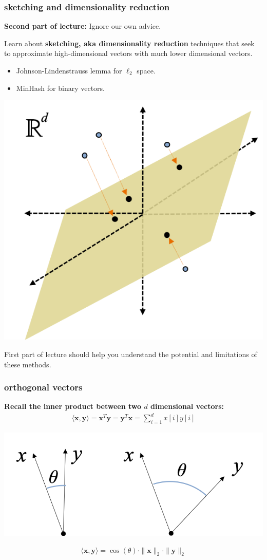 \documentclass[compress]{beamer}
\newcommand{\bv}[1]{\mathbf{#1}}
\begin{document}
\begin{frame}
	\frametitle{sketching and dimensionality reduction}
	\begin{center}
		\textbf{Second part of lecture:} Ignore our own advice. 
	\end{center}
		Learn about \alert{\textbf{sketching, aka dimensionality reduction}} techniques that seek to approximate high-dimensional vectors with much lower dimensional vectors. 
		\begin{itemize}
			\item Johnson-Lindenstrauss lemma for $\ell_2$ space.
			\item MinHash for binary vectors. 
		\end{itemize}
		\begin{center}
			\vspace{-.75em}
		\includegraphics[width=.3\textwidth]{random_projection.png}
		\vspace{-.75em}
		\end{center}
		
		First part of lecture should help you understand the potential and limitations of these methods. 
\end{frame}

\begin{frame}[t]
	\frametitle{orthogonal vectors}
		\textbf{Recall the inner product between two $d$ dimensional vectors:}
		\begin{align*}
			\langle \bv{x},\bv{y} \rangle = \bv{x}^T\bv{y} = \bv{y}^T\bv{x} = \sum_{i=1}^d x[i]y[i]
		\end{align*}
	\begin{center}
		\includegraphics[width=.7\textwidth]{inner_product.png}
	\end{center}
	
	\begin{align*}
		\langle \bv{x},\bv{y} \rangle = \cos(\theta)\cdot\|\bv{x}\|_2\cdot\|\bv{y}\|_2
	\end{align*}
\end{frame}
\end{document}
